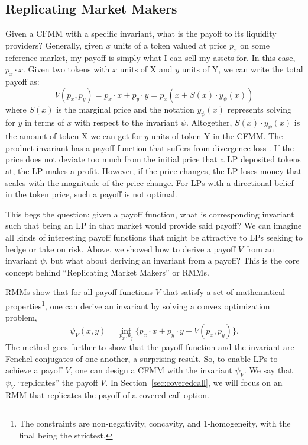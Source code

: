 \documentclass[hidelinks, 12pt]{article}
\begin{document}
\subsection{Replicating Market Makers}

Given a CFMM with a specific invariant, what is the payoff to its liquidity providers? Generally, given $x$ units of a token valued at price $p_x$ on some reference market, my payoff is simply what I can sell my assets for. In this case,  $p_x \cdot x$. Given two tokens with $x$ units of X and $y$ units of Y, we can write the total payoff as:
\[V(p_x, p_y) = p_x\cdot x + p_y \cdot y = p_x (x + S(x)\cdot y_\psi(x))\]
where $S(x)$ is the marginal price and the notation $y_\psi(x)$ represents solving for $y$ in terms of $x$ with respect to the invariant $\psi$.
Altogether, $S(x)\cdot y_\psi(x)$ is the amount of token X we can get for $y$ units of token Y in the CFMM.
The product invariant has a payoff function that suffers from divergence loss \cite{angeris2019analysis}. If the price does not deviate too much from the initial price that a LP deposited tokens at, the LP makes a profit. However, if the price changes, the LP loses money that scales with the magnitude of the price change. For LPs with a directional belief in the token price, such a payoff is not optimal.

This begs the question: given a payoff function, what is corresponding invariant such that being an LP in that market would provide said payoff? We can imagine all kinds of interesting payoff functions that might be attractive to LPs seeking to hedge or take on risk.  Above, we showed how to derive a payoff $V$ from an invariant $\psi$, but what about deriving an invariant from a payoff? This is the core concept behind ``Replicating Market Makers'' or RMMs.

RMMs \cite{angeris2021replicating} show that for all payoff functions $V$ that satisfy a set of mathematical properties\footnote{The constraints are non-negativity, concavity, and 1-homogeneity, with the final being the strictest.}, one can derive an invariant by solving a convex optimization problem,
\[ \psi_V(x, y) = \inf_{p_x, p_y} \{ p_x \cdot x + p_y \cdot y - V(p_x, p_y) \}. \]
The method goes further to show that the payoff function and the invariant are Fenchel conjugates of one another, a surprising result. So, to enable LPs to achieve a payoff $V$, one can design a CFMM with the invariant $\psi_V$. We say that $\psi_V$ ``replicates'' the payoff $V$. In Section~\ref{sec:coveredcall}, we will focus on an RMM that replicates the payoff of a covered call option.
\end{document}
